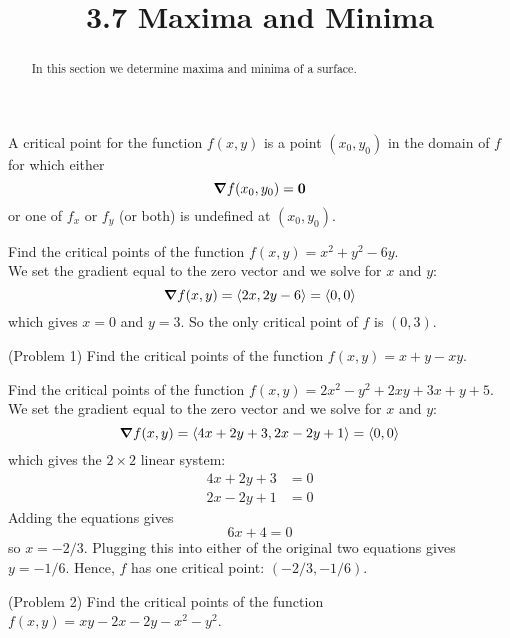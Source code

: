 \documentclass[handout]{ximera}
\title{3.7 Maxima and Minima}
\begin{document}
\begin{abstract}
In this section we determine maxima and minima of a surface.
\end{abstract}

\maketitle

\begin{definition}
A critical point for the function $f(x,y)$ is a point $(x_0, y_0)$ in the domain of $f$ for which either
\[
\boldsymbol\nabla f(x_0, y_0) = \mathbf 0
\]
or one of $f_x$ or $f_y$ (or both) is undefined at $(x_0, y_0)$.
\end{definition}

\begin{example}[Example 1]
Find the critical points of the function $f(x,y) = x^2 + y^2 - 6y$.\\
We set the gradient equal to the zero vector and we solve for $x$ and $y$:
\[
\boldsymbol\nabla f(x,y) = \left\langle 2x, 2y -6\right\rangle = \left\langle 0,0\right\rangle
\]
which gives $x = 0$ and $y = 3$.  So the only critical point of $f$ is $(0,3)$.
\end{example}

\begin{problem}(Problem 1)
Find the critical points of the function $f(x,y) = x+ y - xy$.
\end{problem}




\begin{example}[Example 2]
Find the critical points of the function $f(x,y) = 2x^2 - y^2 +2xy + 3x + y+ 5$.\\
We set the gradient equal to the zero vector and we solve for $x$ and $y$:
\[
\boldsymbol\nabla f(x,y) = \left\langle 4x+2y + 3, 2x - 2y + 1\right\rangle = \left\langle 0,0\right\rangle
\]
which gives the $2 \times 2$ linear system:
\begin{align*}
4x+2y + 3 &= 0\\
2x -2y + 1 & = 0
\end{align*}
Adding the equations gives 
\[
6x + 4 = 0
\]
so $x = -2/3$. Plugging this into either of the original two equations gives $y = -1/6$.
Hence, $f$ has one critical point: $(-2/3, -1/6)$.
\end{example}

\begin{problem}(Problem 2)
Find the critical points of the function $f(x,y) = xy - 2x-2y-x^2 - y^2$.
\end{problem}
\end{document}
